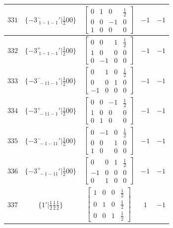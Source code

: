 \documentclass[fleqn,8pt]{jsarticle}
\begin{document}
\begin{longtable}{ccccc}
$ 331 $ & $ \{-3^{-}_{\,\,1-1-1}{}'|\frac{1}{2} 0 0\} $ & $ \begin{bmatrix} 0 & 1 & 0 & \frac{1}{2} \\ 0 & 0 & -1 & 0 \\ 1 & 0 & 0 & 0 \end{bmatrix} $ & $ -1 $ & $ -1 $ \\ \hline
$ 332 $ & $ \{-3^{+}_{\,\,1-1-1}{}'|\frac{1}{2} 0 0\} $ & $ \begin{bmatrix} 0 & 0 & 1 & \frac{1}{2} \\ 1 & 0 & 0 & 0 \\ 0 & -1 & 0 & 0 \end{bmatrix} $ & $ -1 $ & $ -1 $ \\ \hline
$ 333 $ & $ \{-3^{-}_{\,\,-11-1}{}'|\frac{1}{2} 0 0\} $ & $ \begin{bmatrix} 0 & 1 & 0 & \frac{1}{2} \\ 0 & 0 & 1 & 0 \\ -1 & 0 & 0 & 0 \end{bmatrix} $ & $ -1 $ & $ -1 $ \\ \hline
$ 334 $ & $ \{-3^{+}_{\,\,-11-1}{}'|\frac{1}{2} 0 0\} $ & $ \begin{bmatrix} 0 & 0 & -1 & \frac{1}{2} \\ 1 & 0 & 0 & 0 \\ 0 & 1 & 0 & 0 \end{bmatrix} $ & $ -1 $ & $ -1 $ \\ \hline
$ 335 $ & $ \{-3^{-}_{\,\,-1-11}{}'|\frac{1}{2} 0 0\} $ & $ \begin{bmatrix} 0 & -1 & 0 & \frac{1}{2} \\ 0 & 0 & 1 & 0 \\ 1 & 0 & 0 & 0 \end{bmatrix} $ & $ -1 $ & $ -1 $ \\ \hline
$ 336 $ & $ \{-3^{+}_{\,\,-1-11}{}'|\frac{1}{2} 0 0\} $ & $ \begin{bmatrix} 0 & 0 & 1 & \frac{1}{2} \\ -1 & 0 & 0 & 0 \\ 0 & 1 & 0 & 0 \end{bmatrix} $ & $ -1 $ & $ -1 $ \\ \hline
$ 337 $ & $ \{1{}'|\frac{1}{2} \frac{1}{2} \frac{1}{2}\} $ & $ \begin{bmatrix} 1 & 0 & 0 & \frac{1}{2} \\ 0 & 1 & 0 & \frac{1}{2} \\ 0 & 0 & 1 & \frac{1}{2} \end{bmatrix} $ & $ 1 $ & $ -1 $ \\ \hline

\end{longtable}
\end{document}
